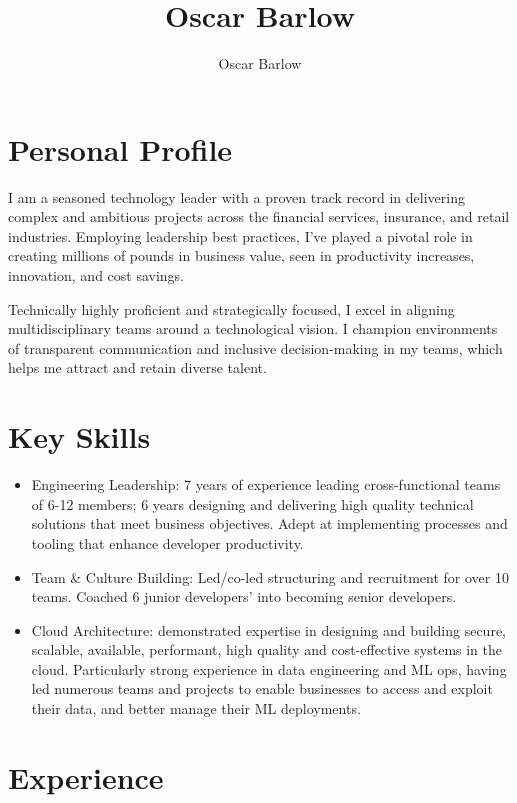 \documentclass[a4paper]{scrartcl}
\author{Oscar Barlow}
\title{Oscar Barlow}
\date{}
\begin{document}
\maketitle

\section*{Personal Profile}
 { %
  \setlength{\parskip}{6pt plus 2pt minus 1pt}
  I am a seasoned technology leader with a proven track record in
  delivering complex and ambitious projects across the financial services,
  insurance,
  and retail industries. Employing leadership best practices, I've played a pivotal role in creating
  millions of pounds in business value, seen in
  productivity increases, innovation, and cost savings.

  Technically highly proficient and strategically focused, I excel in aligning
  multidisciplinary
  teams around a technological vision. I champion environments of
  transparent communication and inclusive decision-making in my teams, which helps me attract and retain diverse talent.
 } %

\section*{Key Skills}
\begin{itemize}
	\item Engineering Leadership: 7 years of experience leading cross-functional teams of 6-12 members; 6 years designing and delivering high quality technical solutions that meet business objectives. Adept at implementing processes and tooling that enhance developer productivity.
	\item Team \& Culture Building: Led/co-led structuring and recruitment for over 10 teams. Coached 6 junior developers' into becoming senior developers.
	\item Cloud Architecture: demonstrated expertise in designing and building secure,
	      scalable, available, performant, high quality and cost-effective
	      systems in the
	      cloud. Particularly strong experience in data engineering and ML ops, having led numerous teams and projects to enable businesses to access and exploit their data, and better manage their ML deployments.
\end{itemize}

\section*{Experience}
\end{document}
